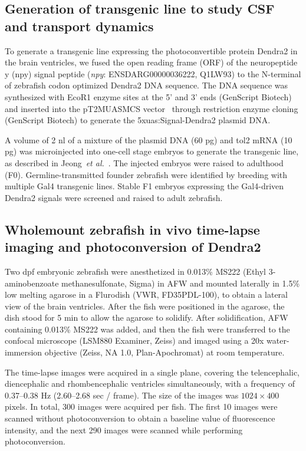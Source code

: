 \documentclass{WileyMSP-template}
\begin{document}
\subsection{Generation of transgenic line to study CSF and transport dynamics} 
To generate a transgenic line expressing the photoconvertible protein Dendra2 in
the brain ventricles, we fused the open reading frame (ORF)
of the neuropeptide y (npy) signal peptide
(\emph{npy}: ENSDARG00000036222, Q1LW93) to the N-terminal of
zebrafish codon optimized Dendra2 DNA sequence.
The DNA sequence was synthesized with EcoR1 enzyme sites at the 5’ and
3’ ends (GenScript Biotech) and inserted into the
pT2MUASMCS vector~\cite{Asakawa2008GeneticZebrafish}
through restriction enzyme cloning (GenScript Biotech)
to generate the 5xuas:Signal-Dendra2 plasmid DNA.

A volume of 2 nl of a mixture of the plasmid DNA (60 pg) and tol2 mRNA (10 pg)
was microinjected into one-cell stage embryos to generate the transgenic line,
as described in Jeong~\emph{et al.}~\cite{Jeong2024TheZebrafish}. The injected
embryos were raised to adulthood (F0).
Germline-transmitted founder zebrafish were identified by breeding with
multiple Gal4 transgenic lines. Stable F1 embryos expressing the Gal4-driven
Dendra2 signals were screened and raised to adult zebrafish.

\subsection{Wholemount zebrafish in vivo time-lapse imaging and photoconversion of Dendra2}
Two dpf embryonic zebrafish were anesthetized in 0.013\% MS222
(Ethyl 3-aminobenzoate methanesulfonate, Sigma) in AFW and
mounted laterally in 1.5\% low melting agarose in a Flurodish (VWR, FD35PDL-100),
to obtain a lateral view of the brain ventricles. After the
fish were positioned in the agarose, the dish stood for 5 min to allow the agarose to solidify.
After solidification, AFW containing 0.013\% MS222 was added,
and then the fish were transferred to the confocal microscope (LSM880 Examiner, Zeiss)
and imaged using a 20x water-immersion objective (Zeiss, NA 1.0, Plan-Apochromat)
at room temperature.

The time-lapse images were acquired in a single plane, covering the
telencephalic, diencephalic and rhombencephalic ventricles simultaneously,
with a frequency of 0.37--0.38 Hz (2.60--2.68 sec / frame). The size
of the images was $1024\times400$ pixels. In total, 300 images were acquired per fish.
The first 10 images were scanned without photoconversion to obtain a
baseline value of fluorescence intensity, and the next 290 images were
scanned while performing photoconversion. 
\end{document}
